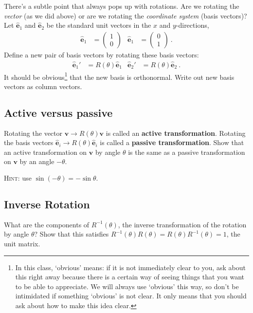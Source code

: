 \documentclass[12pt]{article}
\numberwithin{equation}{section}    %
\renewcommand{\vec}[1]{\mathbf{#1}} %
\begin{document}
There's a subtle point that always pops up with rotations. Are we rotating the \emph{vector} (as we did above) or are we rotating the \emph{coordinate system} (basis vectors)?  Let $\hat{\vec{e}}_1$ and $\hat{\vec{e}}_2$ be the standard unit vectors in the $x$ and $y$-directions,
\begin{align}
	\hat{\vec{e}}_1 &= 
	\begin{pmatrix}
		1\\0
	\end{pmatrix}
	&
	\hat{\vec{e}}_1 &= 
	\begin{pmatrix}
		0\\1
	\end{pmatrix} \ .
\end{align}
Define a new pair of basis vectors by rotating these basis vectors:
\begin{align}
	\hat{\vec{e}}_1' &= R(\theta) \hat{\vec{e}}_1 & 
	\hat{\vec{e}}_2' &= R(\theta) \hat{\vec{e}}_2 \ .
\end{align}
It should be obvious\footnote{In this class, `obvious' means: if it is not immediately clear to you, ask about this right away because there is a certain way of seeing things that you want to be able to appreciate. We will always use `obvious' this way, so don't be intimidated if something `obvious' is not clear. It only means that you should ask about how to make this idea clear.} that the new basis is orthonormal. Write out new basis vectors as column vectors.

\subsection{Active versus passive}

Rotating the vector $\vec{v}\to R(\theta)\vec{v}$ is called an \textbf{active transformation}. Rotating the basis vectors $\hat{\vec{e}}_i\to R(\theta) \hat{\vec{e}}_i$ is called a \textbf{passive transformation}. Show that an active transformation on $\vec{v}$ by angle $\theta$ is the same as a passive transformation on $\vec{v}$ by an angle $-\theta$.

\textsc{Hint}: use $\sin(-\theta) = -\sin\theta$. 


\subsection{Inverse Rotation}

What are the components of $R^{-1}(\theta)$, the inverse transformation of the rotation by angle $\theta$? Show that this satisfies $R^{-1}(\theta)R(\theta) = R(\theta)R^{-1}(\theta) = 1$, the unit matrix.
\end{document}
